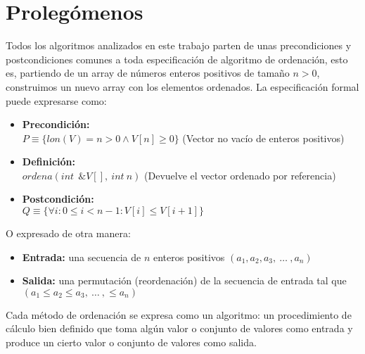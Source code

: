 \section{Proleg\'omenos}
Todos los algoritmos analizados en este trabajo parten de unas precondiciones y postcondiciones comunes a toda especificación de algoritmo de ordenación, esto es, partiendo de un array de números enteros positivos de tamaño $n > 0$, construimos un nuevo array con los elementos ordenados.  La especificación formal puede expresarse como:
\begin{itemize}
\item \textbf{Precondición:}\\
$P \equiv \{lon(V) = n > 0 \wedge V[n] \geq 0\}$ (Vector no vacío de enteros positivos)
\item \textbf{Definición:}\\$ordena(int \:\: \&V[],\: int \:n)$ (Devuelve el vector ordenado por referencia)
\item \textbf{Postcondición:}\\
$Q \equiv \{\forall{i} : 0 \leq i < n - 1: V[i] \leq V[i + 1]\}$
\end{itemize}
O expresado de otra manera:\cite{CORMEN} 
\begin{itemize}
\item \textbf{Entrada:} una secuencia de $n$ enteros positivos $(a_{1}, a_{2}, a_{3}, \:  \ldots\: , a_{n})$
\item \textbf{Salida:} una permutación (reordenación) de la secuencia de entrada tal que $(a_{1} \leq a_{2}  \leq a_{3},\:  \ldots\:  , \leq  a_{n})$
\end{itemize}

Cada método de ordenación se expresa como un algoritmo: un procedimiento de cálculo bien definido que toma algún valor o conjunto de valores como entrada y produce un cierto valor o conjunto de valores como salida.\cite{CORMEN} 
